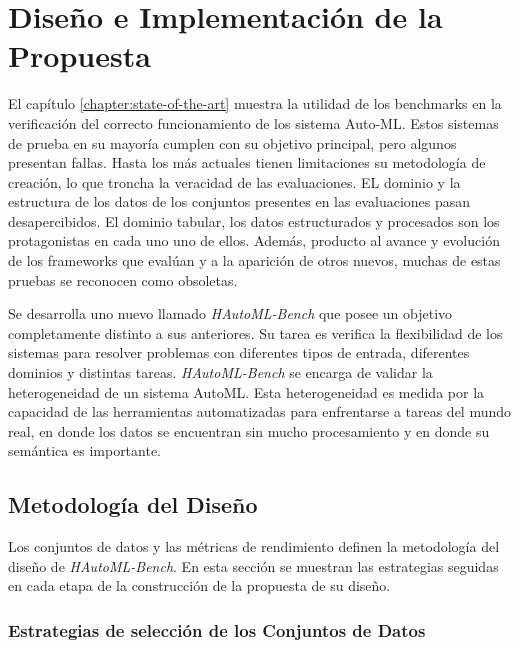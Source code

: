 \chapter{Diseño e Implementación de la Propuesta}\label{chapter:design}



El capítulo \ref{chapter:state-of-the-art} muestra la utilidad de los benchmarks en la verificación del correcto funcionamiento de los sistema Auto-ML.
Estos sistemas de prueba en su mayoría cumplen con su objetivo principal, pero algunos presentan fallas. Hasta los más actuales 
tienen limitaciones  su metodología de creación, lo que troncha la veracidad de las evaluaciones. 
EL dominio y la estructura de los datos de los conjuntos presentes en las evaluaciones pasan desapercibidos.
El dominio tabular, los datos estructurados y procesados son los protagonistas en cada uno uno de ellos. 
Además, producto al avance y evolución de los frameworks que evalúan y a la aparición de otros nuevos, muchas de estas pruebas se reconocen como obsoletas. 

Se desarrolla uno nuevo llamado \textit{HAutoML-Bench} que posee un objetivo completamente distinto a sus anteriores. Su tarea es verifica la flexibilidad de los 
sistemas para resolver problemas con diferentes tipos de entrada, diferentes dominios y 
distintas tareas. \textit{HAutoML-Bench} se encarga de validar la heterogeneidad de un sistema AutoML. Esta heterogeneidad es medida 
por la capacidad de las herramientas automatizadas para enfrentarse a tareas del mundo real, en donde los datos se encuentran sin mucho procesamiento y en 
donde su semántica es importante.


\section{Metodología del Diseño }\label{section:design}

Los conjuntos de datos y las métricas de rendimiento definen la metodología del diseño de \textit{HAutoML-Bench}. En esta sección se muestran las estrategias seguidas 
en cada etapa de la construcción de la propuesta de su diseño. 

\subsection{Estrategias de selección de los Conjuntos de Datos}\label{subsection:selection}

